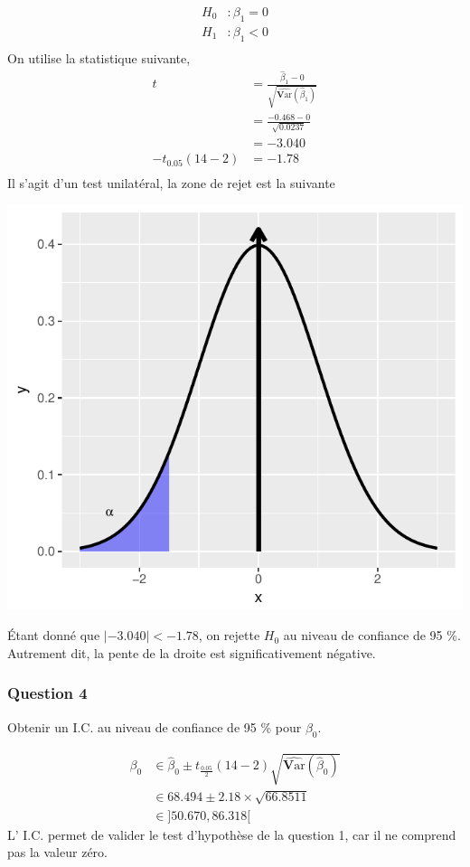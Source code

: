 \documentclass[11pt,french]{report}
\newcommand{\Var}{\mathrm{\textbf{V}ar}}
\begin{document}
\begin{align*}
H_0 &: \beta_1 = 0\\
H_1 &: \beta_1 < 0 \\
\end{align*}
On utilise la statistique suivante,
\begin{align*}
t &= \frac{\hat{\beta}_1 - 0 }{\sqrt{\widehat{\Var}(\hat{\beta}_1)}} \\
&= \frac{-0.468 - 0}{\sqrt{0.0237}} \\
&= -3.040 \\
-t_{0.05}(14-2) &= -1.78 \\
\end{align*}
Il s'agit d'un test unilatéral, la zone de rejet est la suivante

\includegraphics{notes_de_cours-016}

Étant donné que $|-3.040| < -1.78$, on rejette $H_0$ au niveau de confiance de 95 \%. Autrement dit, la pente de la droite est significativement négative.

\subsubsection*{Question 4}
Obtenir un I.C. au niveau de confiance de 95 \% pour $\beta_0$.

\begin{align*}
\beta_0 &\in \hat{\beta}_0 \pm t_{\frac{0.05}{2}}(14-2)\sqrt{\widehat{\Var}(\hat{\beta}_0)} \\
& \in 68.494 \pm 2.18 \times \sqrt{66.8511} \\
&\in \big] 50.670, 86.318 \big[
\end{align*}
L' I.C. permet de valider le test d'hypothèse de la question 1, car il ne comprend pas la valeur zéro.
\end{document}
